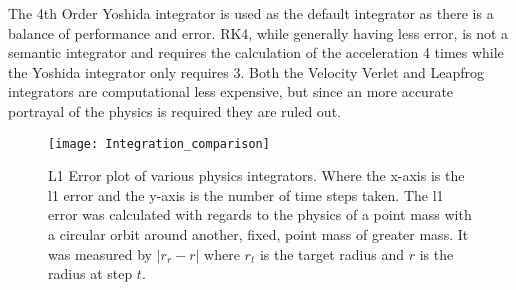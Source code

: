 The 4th Order Yoshida integrator is used as the default integrator as there is a balance of performance and error. RK4, while generally having less error, is not a semantic integrator and requires the calculation of the acceleration 4 times while the Yoshida integrator only requires 3. Both the Velocity Verlet and Leapfrog integrators are computational less expensive, but since an more accurate portrayal of the physics is required they are ruled out.

\begin{figure} 
\centering 
\texttt{[image: Integration\_comparison]}
\caption{L1 Error plot of various physics integrators. Where the x-axis is the l1 error and the y-axis is the number of time steps taken. The l1 error was calculated with regards to the physics of a point mass with a circular orbit around another, fixed, point mass of greater mass. It was measured by $|r_r-r|$ where $r_t$ is the target radius and $r$ is the radius at step $t$.} \label{fig:integratorerror}
\end{figure} 
